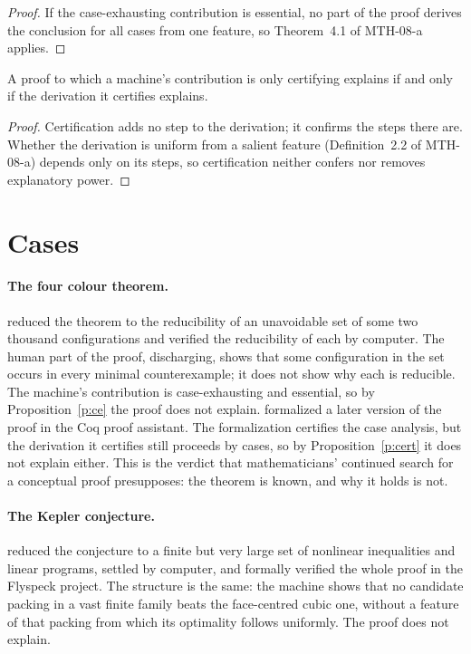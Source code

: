 \documentclass{situationist-preprint}
\begin{document}
\begin{proof}
If the case-exhausting contribution is essential, no part of the proof derives the conclusion for all cases from one feature, so Theorem~4.1 of MTH-08-a applies.
\end{proof}

\begin{proposition}\label{p:cert}
A proof to which a machine's contribution is only certifying explains if and only if the derivation it certifies explains.
\end{proposition}

\begin{proof}
Certification adds no step to the derivation; it confirms the steps there are. Whether the derivation is uniform from a salient feature (Definition~2.2 of MTH-08-a) depends only on its steps, so certification neither confers nor removes explanatory power.
\end{proof}

\section{Cases}

\paragraph{The four colour theorem.} \citet{AppelHaken1977} reduced the theorem to the reducibility of an unavoidable set of some two thousand configurations and verified the reducibility of each by computer. The human part of the proof, discharging, shows that some configuration in the set occurs in every minimal counterexample; it does not show why each is reducible. The machine's contribution is case-exhausting and essential, so by Proposition~\ref{p:ce} the proof does not explain. \citet{Gonthier2008} formalized a later version of the proof in the Coq proof assistant. The formalization certifies the case analysis, but the derivation it certifies still proceeds by cases, so by Proposition~\ref{p:cert} it does not explain either. This is the verdict that mathematicians' continued search for a conceptual proof presupposes: the theorem is known, and why it holds is not.

\paragraph{The Kepler conjecture.} \citet{Hales2005} reduced the conjecture to a finite but very large set of nonlinear inequalities and linear programs, settled by computer, and \citet{HalesEtAl2017} formally verified the whole proof in the Flyspeck project. The structure is the same: the machine shows that no candidate packing in a vast finite family beats the face-centred cubic one, without a feature of that packing from which its optimality follows uniformly. The proof does not explain.
\end{document}
